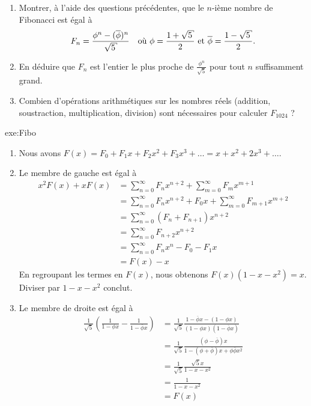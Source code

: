 {	\begin{enumerate}[resume]
		\item
		Montrer, à l'aide des questions précédentes, que le $n$-ième nombre de Fibonacci est égal à
		\begin{align*}
			F_n = \frac{\phi^{n} - (\overline{\phi})^{n}}{\sqrt5} && \text{où } \phi = \frac{1+\sqrt5}2 \et \overline{\phi} = \frac{1-\sqrt5}2.
		\end{align*}
		\item
		En déduire que $F_n$ est l'entier le plus proche de $\frac{\phi^n}{\sqrt5}$ pour tout $n$ suffisamment grand.
		\item
		Combien d'opérations arithmétiques sur les nombres réels (addition, soustraction, multiplication, division) sont nécessaires pour calculer $F_{1024}$ ?
	\end{enumerate}
}{exe:Fibo}{
	\begin{enumerate}
		\item
		Nous avons $F(x) = F_0 + F_1x + F_2x^2 + F_3x^3 + \dots = x + x^2 + 2x^3 + \dots$.
	
		\item
		Le membre de gauche est égal à
		\begin{align*}
			x^2 F(x) + x F(x) &= \sum_{n=0}^{\infty} F_n x^{n+2} + \sum_{m=0}^{\infty} F_mx^{m+1} \\
				&= \sum_{n=0}^{\infty} F_n x^{n+2} + F_0 x + \sum_{m=0}^{\infty} F_{m+1} x^{m+2} \\
				&= \sum_{n=0}^{\infty} (F_n + F_{n+1}) x^{n+2} \\
				&= \sum_{n=0}^{\infty} F_{n+2}x^{n+2} \\
				&= \sum_{n=0}^{\infty} F_n x^n - F_0 - F_1x \\
				&= F(x) - x
		\end{align*}
		En regroupant les termes en $F(x)$, nous obtenons $F(x) (1 - x - x^2) = x$.
		Diviser par $1-x-x^2$ conclut.
		
		\item
		Le membre de droite est égal à
		\begin{align*}
			 \frac{1}{\sqrt5} \left( \frac1{1-\phi x} - \frac1{1-\overline{\phi}x} \right) &= 
			 \frac{1}{\sqrt5} \frac{1-\overline{\phi}x - (1-\phi x)}{(1-\phi x)(1-\overline{\phi}x)}  \\
			 &= \frac{1}{\sqrt5} \frac{(\phi-\overline{\phi})x}{1 - (\phi + \overline{\phi})x + \phi\overline{\phi} x^2}  \\
			 &= \frac{1}{\sqrt5} \frac{\sqrt5x}{1 -x - x^2}  \\
			 &= \frac{1}{1-x-x^2} \\
			 &= F(x)
		\end{align*}
		

\end{enumerate}}
